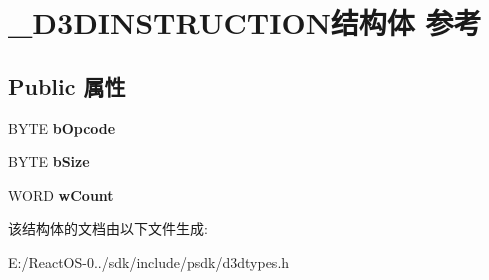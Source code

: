 \hypertarget{struct___d3_d_i_n_s_t_r_u_c_t_i_o_n}{}\section{\+\_\+\+D3\+D\+I\+N\+S\+T\+R\+U\+C\+T\+I\+O\+N结构体 参考}
\label{struct___d3_d_i_n_s_t_r_u_c_t_i_o_n}
\subsection*{Public 属性}
\begin{DoxyCompactItemize}
\item 
\mbox{\label{struct___d3_d_i_n_s_t_r_u_c_t_i_o_n_afcc6d8691f239c7851f5bb8edef759b9}} 
B\+Y\+TE {\bfseries b\+Opcode}
\item 
\mbox{\label{struct___d3_d_i_n_s_t_r_u_c_t_i_o_n_a30e8c63398a63faf2f2c11a0f456065e}} 
B\+Y\+TE {\bfseries b\+Size}
\item 
\mbox{\label{struct___d3_d_i_n_s_t_r_u_c_t_i_o_n_a641b0784b297b0ad645825b14b4f91fa}} 
W\+O\+RD {\bfseries w\+Count}
\end{DoxyCompactItemize}


该结构体的文档由以下文件生成\+:\begin{DoxyCompactItemize}
\item 
E\+:/\+React\+O\+S-\/0../sdk/include/psdk/d3dtypes.\+h\end{DoxyCompactItemize}
